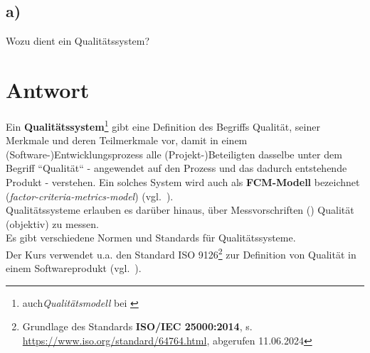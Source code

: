 \subsection*{a)}
Wozu dient ein Qualitätssystem?

\section*{Antwort}
Ein \textbf{Qualitätssystem}\footnote{
    auch\textit{Qualitätsmodell} bei \cite[461 ff.]{Bal08}
} gibt eine Definition des Begriffs Qualität, seiner Merkmale und deren Teilmerkmale vor, damit in einem (Software-)Entwicklungsprozess alle (Projekt-)Beteiligten dasselbe unter dem Begriff ``Qualität`` - angewendet auf den Prozess und das dadurch entstehende Produkt - verstehen. Ein solches System wird auch als \textbf{FCM-Modell} bezeichnet (\textit{factor-criteria-metrics-model}) (vgl.~\cite[462]{Bal08}).\\
Qualitätssysteme erlauben es darüber hinaus, über Messvorschriften () Qualität (objektiv) zu messen.\\

\noindent
Es gibt verschiedene Normen und Standards für Qualitätssysteme.\\
Der Kurs verwendet u.a. den Standard ISO 9126\footnote{
    Grundlage des Standards \textbf{ISO/IEC 25000:2014}, s. \url{https://www.iso.org/standard/64764.html}, abgerufen 11.06.2024
} zur Definition von Qualität in einem Softwareprodukt (vgl.~\cite[Abb. 1.2]{Wed09c}).